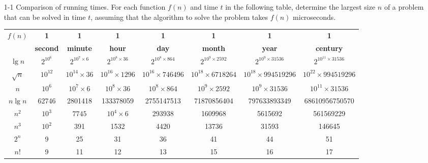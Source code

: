 \begin{enumerate}

\item[1{-}1] Comparison of running times. For each function $f(n)$ and
  time $t$ in the following table, determine the largest size $n$ of a problem
  that can be solved in time $t$, assuming that the algorithm to solve the problem
  takes $f(n)$ microseconds.

\begin{framed}
\centering
\footnotesize
\begin{tabular}{cccccccc}
  \toprule
  \multirow{2}{*}{$f(n)$} & \textbf{1} & \textbf{1} & \textbf{1} & \textbf{1} &
  \textbf{1} & \textbf{1} & \textbf{1}\\
  & \textbf{second} & \textbf{minute} & \textbf{hour} & \textbf{day} &
    \textbf{month} & \textbf{year} & \textbf{century}\\

  \midrule

  $\lg n$ & $2^{10^6}$ & $2^{10^7 \times 6}$ & $2^{10^8 \times 36}$ &
  $2^{10^8 \times 864}$ & $2^{10^9 \times 2592}$ &
  $2^{10^9 \times 31536}$ & $2^{10^{11} \times 31536}$ \\

  $\sqrt{n}$ & $10^{12}$ & $10^{14} \times 36$ & $10^{16} \times 1296$ &
  $10^{16} \times 746496$ & $10^{18} \times 6718264$ &
  $10^{18} \times 994519296$ & $10^{22} \times 994519296$ \\

  $n$ & $10^6$ & $10^7 \times 6$ & $10^8 \times 36$ &
  $10^8 \times 864$ & $10^9 \times 2592$ &
  $10^9 \times 31536$ & $10^{11} \times 31536$ \\

  $n \lg n$ & 62746 & 2801418 & 133378059 & 2755147513 & 71870856404 &
  797633893349 & 68610956750570 \\

  $n^2$ & $10^3$ & $7745$ & $10^4 \times 6$ & 293938 & 1609968 & 5615692 &
  561569229 \\

  $n^3$ & $10^2$ & 391 & 1532 & 4420 & 13736 & 31593 & 146645\\

  $2^n$ & 9 & 25 & 31 & 36 & 41 & 44 & 51\\

  $n!$ & 9 & 11 & 12 & 13 & 15 & 16 & 17\\

  \bottomrule
\end{tabular}
\end{framed}

\end{enumerate}
